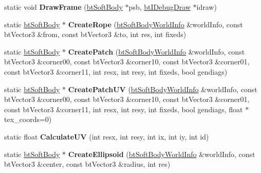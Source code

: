 \begin{DoxyCompactItemize}
\item 
\hypertarget{structbt_soft_body_helpers_acbdfb1037e14e5e77acd96ce84452447}{static void {\bfseries Draw\+Frame} (\hyperlink{classbt_soft_body}{bt\+Soft\+Body} $\ast$psb, \hyperlink{classbt_i_debug_draw}{bt\+I\+Debug\+Draw} $\ast$idraw)}\label{structbt_soft_body_helpers_acbdfb1037e14e5e77acd96ce84452447}

\item 
\hypertarget{structbt_soft_body_helpers_ae181781df4faf89ab9ae95367fcd249f}{static \hyperlink{classbt_soft_body}{bt\+Soft\+Body} $\ast$ {\bfseries Create\+Rope} (\hyperlink{structbt_soft_body_world_info}{bt\+Soft\+Body\+World\+Info} \&world\+Info, const bt\+Vector3 \&from, const bt\+Vector3 \&to, int res, int fixeds)}\label{structbt_soft_body_helpers_ae181781df4faf89ab9ae95367fcd249f}

\item 
\hypertarget{structbt_soft_body_helpers_a40b5859c925488ce533c020aa7c41202}{static \hyperlink{classbt_soft_body}{bt\+Soft\+Body} $\ast$ {\bfseries Create\+Patch} (\hyperlink{structbt_soft_body_world_info}{bt\+Soft\+Body\+World\+Info} \&world\+Info, const bt\+Vector3 \&corner00, const bt\+Vector3 \&corner10, const bt\+Vector3 \&corner01, const bt\+Vector3 \&corner11, int resx, int resy, int fixeds, bool gendiags)}\label{structbt_soft_body_helpers_a40b5859c925488ce533c020aa7c41202}

\item 
\hypertarget{structbt_soft_body_helpers_a1f7bfd324af3b2007a7d8b759ba4b53b}{static \hyperlink{classbt_soft_body}{bt\+Soft\+Body} $\ast$ {\bfseries Create\+Patch\+U\+V} (\hyperlink{structbt_soft_body_world_info}{bt\+Soft\+Body\+World\+Info} \&world\+Info, const bt\+Vector3 \&corner00, const bt\+Vector3 \&corner10, const bt\+Vector3 \&corner01, const bt\+Vector3 \&corner11, int resx, int resy, int fixeds, bool gendiags, float $\ast$tex\+\_\+coords=0)}\label{structbt_soft_body_helpers_a1f7bfd324af3b2007a7d8b759ba4b53b}

\item 
\hypertarget{structbt_soft_body_helpers_a7d29e3138e4c6a657e6cb38da01059e0}{static float {\bfseries Calculate\+U\+V} (int resx, int resy, int ix, int iy, int id)}\label{structbt_soft_body_helpers_a7d29e3138e4c6a657e6cb38da01059e0}

\item 
\hypertarget{structbt_soft_body_helpers_a72759ba7ef471e2eee6ca79e670e74d4}{static \hyperlink{classbt_soft_body}{bt\+Soft\+Body} $\ast$ {\bfseries Create\+Ellipsoid} (\hyperlink{structbt_soft_body_world_info}{bt\+Soft\+Body\+World\+Info} \&world\+Info, const bt\+Vector3 \&center, const bt\+Vector3 \&radius, int res)}\label{structbt_soft_body_helpers_a72759ba7ef471e2eee6ca79e670e74d4}


\end{DoxyCompactItemize}
